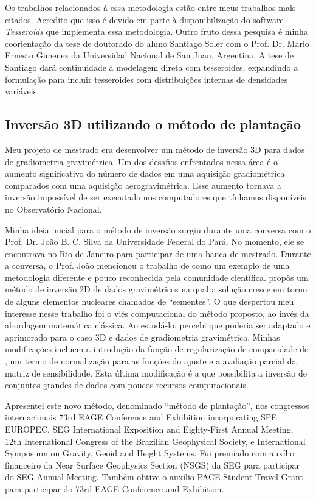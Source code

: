 Os trabalhos relacionados à essa metodologia estão entre meus trabalhos mais
citados.
Acredito que isso é devido em parte à disponibilização do software
\textit{Tesseroids} que implementa essa metodologia.
Outro fruto dessa pesquisa é minha coorientação da tese de doutorado do aluno
Santiago Soler com o Prof. Dr. Mario Ernesto Gimenez da Universidad Nacional de
San Juan, Argentina.
A tese de Santiago dará continuidade à modelagem direta com tesseroides,
expandindo a formulação para incluir tesseroides com distribuições internas de
densidades variáveis.


\subsection{Inversão 3D utilizando o método de plantação}

Meu projeto de mestrado era desenvolver um método de inversão 3D para dados de
gradiometria gravimétrica.
Um dos desafios enfrentados nessa área é o aumento significativo do número de
dados em uma aquisição gradiométrica comparados com uma aquisição
aerogravimétrica.
Esse aumento tornava a inversão impossível de ser executada nos computadores
que tínhamos disponíveis no Observatório Nacional.

Minha ideia inicial para o método de inversão surgiu durante uma conversa com o
Prof. Dr. João B. C. Silva da Universidade Federal do Pará.
No momento, ele se encontrava no Rio de Janeiro para participar de uma banca de
mestrado.
Durante a conversa, o Prof. João mencionou o trabalho de \citet{rene} como um
exemplo de uma metodologia diferente e pouco reconhecida pela comunidade
científica.
\citet{rene} propôs um método de inversão 2D de dados gravimétricos na qual a
solução cresce em torno de alguns elementos nucleares chamados de ``sementes''.
O que despertou meu interesse nesse trabalho foi o viés computacional do método
proposto, ao invés da abordagem matemática clássica.
Ao estudá-lo, percebi que poderia ser adaptado e aprimorado para o
caso 3D e dados de gradiometria gravimétrica.
Minhas modificações incluem a introdução da função de regularização de
compacidade de \citet{silvadias2009},
um termo de normalização para as funções do ajuste
e a avaliação parcial da matriz de sensibilidade.
Esta última modificação é a que possibilita a inversão de conjuntos grandes de
dados com poucos recursos computacionais.

Apresentei este novo método, denominado ``método de plantação'',  nos
congressos internacionais
73rd EAGE Conference and Exhibition incorporating SPE EUROPEC,
SEG International Exposition and Eighty-First Annual Meeting,
12th International Congress of the Brazilian Geophysical Society,
e
International Symposium on Gravity, Geoid and Height Systems.
Fui premiado com auxílio financeiro da Near Surface Geophysics Section (NSGS)
da SEG para participar do SEG Annual Meeting.
Também obtive o auxílio PACE Student Travel Grant para participar do 73rd EAGE
Conference and Exhibition.

